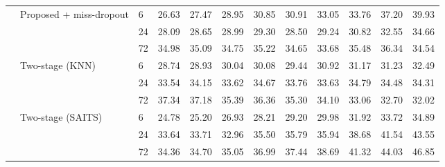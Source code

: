 \begin{table}
\begin{tabular}{lllrrrrrrrrr}
\cline{2-12}
 & \multirow[t]{3}{*}{Proposed + miss-dropout} & 6 & 26.63 & 27.47 & 28.95 & 30.85 & 30.91 & 33.05 & 33.76 & 37.20 & 39.93 \\
 &  & 24 & 28.09 & 28.65 & 28.99 & 29.30 & 28.50 & 29.24 & 30.82 & 32.55 & 34.66 \\
 &  & 72 & 34.98 & 35.09 & 34.75 & 35.22 & 34.65 & 33.68 & 35.48 & 36.34 & 34.54 \\
\cline{2-12}
 & \multirow[t]{3}{*}{Two-stage (KNN)} & 6 & 28.74 & 28.93 & 30.04 & 30.08 & 29.44 & 30.92 & 31.17 & 31.23 & 32.49 \\
 &  & 24 & 33.54 & 34.15 & 33.62 & 34.67 & 33.76 & 33.63 & 34.79 & 34.48 & 34.31 \\
 &  & 72 & 37.34 & 37.18 & 35.39 & 36.36 & 35.30 & 34.10 & 33.06 & 32.70 & 32.02 \\
\cline{2-12}
 & \multirow[t]{3}{*}{Two-stage (SAITS)} & 6 & 24.78 & 25.20 & 26.93 & 28.21 & 29.20 & 29.98 & 31.92 & 33.72 & 34.89 \\
 &  & 24 & 33.64 & 33.71 & 32.96 & 35.50 & 35.79 & 35.94 & 38.68 & 41.54 & 43.55 \\
 &  & 72 & 34.36 & 34.70 & 35.05 & 36.99 & 37.44 & 38.69 & 41.32 & 44.03 & 46.85 \\
\cline{1-12} \cline{2-12}
\bottomrule
\end{tabular}
\end{table}
